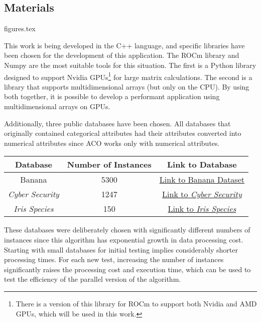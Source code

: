 \subsection{Materials} \label{Materials}

{figures.tex}


This work is being developed in the C++ language, and specific libraries have been chosen for the development of this application. The ROCm library\cite{cupyLib} and Numpy\cite{numpyLib} are the most suitable tools for this situation. The first is a Python library designed to support Nvidia GPUs\footnote[1]{There is a version of this library for ROCm to support both Nvidia and AMD GPUs, which will be used in this work.} for large matrix calculations. The second is a library that supports multidimensional arrays (but only on the CPU). By using both together, it is possible to develop a performant application using multidimensional arrays on GPUs.

Additionally, three public databases have been chosen. All databases that originally contained categorical attributes had their attributes converted into numerical attributes since ACO works only with numerical attributes.

\begin{center}
    \begin{tabular}{|c|c|c|}
        \hline
        Database & Number of Instances & Link to Database \\
        \hline
        Banana & 5300 & \href{https://www.kaggle.com/datasets/saranchandar/standard-classification-banana-dataset}{Link to Banana Dataset} \\
        \hline
        \emph{Cyber Security} & 1247 & \href{https://www.kaggle.com/datasets/deepcontractor/cyber-security-salaries}{Link to \emph{Cyber Security}} \\
        \hline
        \emph{Iris Species} & 150 & \href{https://www.kaggle.com/datasets/uciml/iris}{Link to \emph{Iris Species}} \\
        \hline
    \end{tabular}
\end{center}

These databases were deliberately chosen with significantly different numbers of instances since this algorithm has exponential growth in data processing cost. Starting with small databases for initial testing implies considerably shorter processing times. For each new test, increasing the number of instances significantly raises the processing cost and execution time, which can be used to test the efficiency of the parallel version of the algorithm.

